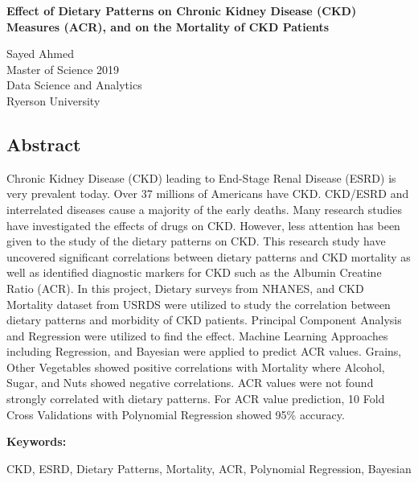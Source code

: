 \begin{center} 
\textbf{Effect of Dietary Patterns on Chronic Kidney Disease (CKD) Measures (ACR), and on the Mortality of CKD Patients} 

Sayed Ahmed \\
Master of Science 2019 \\
Data Science and Analytics \\
Ryerson University \\

\end{center}
\begin{center} \section*{Abstract} \end{center}
Chronic Kidney Disease (CKD) leading to End-Stage Renal Disease (ESRD) is very prevalent today. Over 37 millions of Americans have CKD. CKD/ESRD and interrelated diseases cause a majority of the early deaths.  Many research studies have investigated the effects of drugs on CKD. However, less attention has been given to the study of the dietary patterns on CKD. This research study have uncovered significant correlations between dietary patterns and CKD mortality as well as identified diagnostic markers for CKD such as the Albumin Creatine Ratio (ACR). In this project, Dietary surveys from NHANES, and CKD Mortality dataset from USRDS were utilized to study the correlation between dietary patterns and morbidity of CKD patients. Principal Component Analysis and Regression were utilized to find the effect. Machine Learning Approaches including Regression, and Bayesian were applied to predict ACR values. Grains, Other Vegetables showed positive correlations with Mortality where Alcohol, Sugar, and Nuts showed negative correlations. ACR values were not found strongly correlated with dietary patterns. For ACR value prediction, 10 Fold Cross Validations with Polynomial Regression showed 95\% accuracy.

\medskip
\noindent \textbf{Keywords:} 

\noindent CKD, ESRD, Dietary Patterns, Mortality, ACR, Polynomial Regression, Bayesian